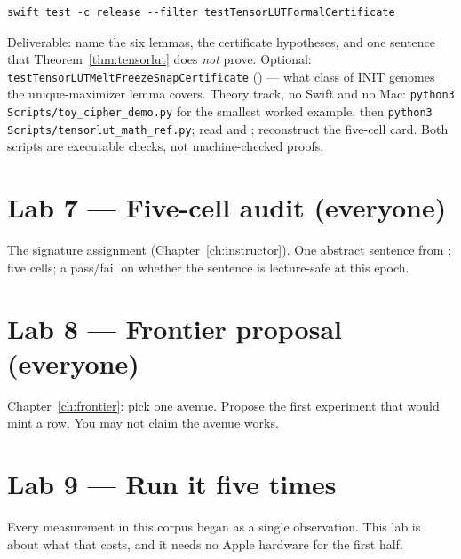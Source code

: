 \begin{lstlisting}
swift test -c release --filter testTensorLUTFormalCertificate
\end{lstlisting}

Deliverable: name the six lemmas, the certificate hypotheses, and one
sentence that Theorem~\ref{thm:tensorlut} does \emph{not} prove.
Optional: \texttt{testTensorLUTMeltFreezeSnapCertificate} () ---
what class of INIT genomes the unique-maximizer lemma covers.
Theory track, no Swift and no Mac: \texttt{python3 Scripts/toy\_cipher\_demo.py}
for the smallest worked example, then
\texttt{python3 Scripts/tensorlut\_math\_ref.py};
read  and
; reconstruct the five-cell card.
Both scripts are executable checks, not machine-checked proofs.

\section{Lab 7 --- Five-cell audit (everyone)}

The signature assignment (Chapter~\ref{ch:instructor}).
One abstract sentence from ; five cells; a
pass/fail on whether the sentence is lecture-safe at this epoch.

\section{Lab 8 --- Frontier proposal (everyone)}

Chapter~\ref{ch:frontier}: pick one avenue. Propose the first experiment
that would mint a  row. You may not claim the avenue works.

\section{\texorpdfstring{Lab 9 --- Run it five times}{Lab 9 --- Run it five times}}
\label{sec:lab-repeat}

Every measurement in this corpus began as a single observation. This lab is about
what that costs, and it needs no Apple hardware for the first half.

